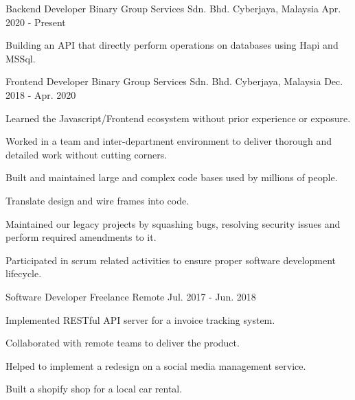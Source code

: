 

\begin{cventries}

\cventry
{Backend Developer} %
{Binary Group Services Sdn. Bhd.} %
{Cyberjaya, Malaysia} %
{Apr. 2020 - Present} %
{
  \begin{cvitems} %
    \item {Building an API that directly perform operations on databases using Hapi and MSSql.}
  \end{cvitems}
}

  \cventry
    {Frontend Developer} %
    {Binary Group Services Sdn. Bhd.} %
    {Cyberjaya, Malaysia} %
    {Dec. 2018 - Apr. 2020} %
    {
      \begin{cvitems} %
        \item {Learned the Javascript/Frontend ecosystem without prior experience or exposure.}
        \item {Worked in a team and inter-department environment to deliver thorough and detailed work without cutting corners.}
        \item {Built and maintained large and complex code bases used by millions of people.}
        \item {Translate design and wire frames into code.}
        \item {Maintained our legacy projects by squashing bugs, resolving security issues and perform required amendments to it.}
        \item {Participated in scrum related activities to ensure proper software development lifecycle.}
      \end{cvitems}
    }

  \cventry
    {Software Developer} %
    {Freelance} %
    {Remote} %
    {Jul. 2017 - Jun. 2018} %
    {
      \begin{cvitems} %
        \item {Implemented RESTful API server for a invoice tracking system.}
        \item {Collaborated with remote teams to deliver the product.}
        \item {Helped to implement a redesign on a social media management service.}
        \item {Built a shopify shop for a local car rental.}
      \end{cvitems}
    }
\end{cventries}
